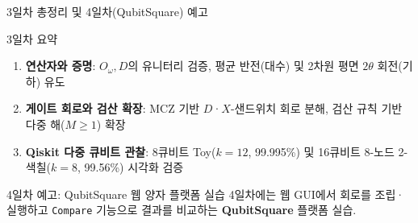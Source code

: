 \documentclass[aspectratio=169, 10pt]{beamer}
\begin{document}
\begin{frame}{3일차 총정리 및 4일차(QubitSquare) 예고}
    \begin{qcblock}{3일차 요약}
        \begin{enumerate}
            \item \textbf{연산자와 증명}: $O_\omega, D$의 유니터리 검증, 평균 반전(대수) 및 2차원 평면 $2\theta$ 회전(기하) 유도
            \item \textbf{게이트 회로와 검산 확장}: $\mathrm{MCZ}$ 기반 $D$·$X$-샌드위치 회로 분해, 검산 규칙 기반 다중 해($M \ge 1$) 확장
            \item \textbf{Qiskit 다중 큐비트 관찰}: 8큐비트 Toy($k=12$, 99.995\%) 및 16큐비트 8-노드 2-색칠($k=8$, 99.56\%) 시각화 검증
        \end{enumerate}
    \end{qcblock}
    \vspace{0.15cm}
    \begin{qctip}{4일차 예고: QubitSquare 웹 양자 플랫폼 실습}
        4일차에는 웹 GUI에서 회로를 조립·실행하고 \texttt{Compare} 기능으로 결과를 비교하는 \textbf{QubitSquare} 플랫폼 실습.
    \end{qctip}
\end{frame}
\end{document}
